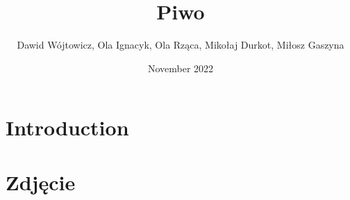 \documentclass{article}
\title{Piwo}
\author{Dawid Wójtowicz, Ola Ignacyk, Ola Rząca, Mikołaj Durkot, Miłosz Gaszyna}
\date{November 2022}
\begin{document}
\maketitle

\section{Introduction}



\section{Zdjęcie}
\usepackage{graphicx}
\graphicspath{ {./monkey.jpg} }
\end{document}
